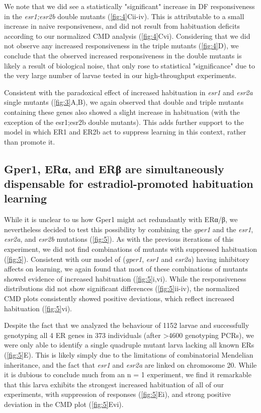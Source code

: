 \documentclass[9.5pt,lineno]{RandlettLab_elife}
\begin{document}
{We note that we did see a statistically "significant" increase in DF responsiveness in the \emph{esr1;esr2b} double mutants (\autoref{fig:4}Cii-iv). 
This is attributable to a small increase in naive responsiveness, and did not result from habituation deficits according to our normalized CMD analysis (\autoref{fig:4}Cvi).
Considering that we did not observe any increased responsiveness in the triple mutants (\autoref{fig:4}D), we conclude that the observed increased responsiveness in the double mutants is likely a result of biological noise, that only rose to statistical "significance" due to the very large number of larvae tested in our high-throughput experiments.

Consistent with the paradoxical effect of increased habituation in \emph{esr1} and \emph{esr2a} single mutants (\autoref{fig:3}A,B), we again observed that double and triple mutants containing these genes also showed a slight increase in habituation (with the exception of the {esr1;esr2b} double mutants).
This adds further support to the model in which ER1 and ER2b act to suppress learning in this context, rather than promote it. 


\subsection{Gper1, ERα, and ERβ are simultaneously dispensable for estradiol-promoted habituation learning}


While it is unclear to us how Gper1 might act redundantly with ERα/β, we nevertheless decided to test this possibility by combining the \emph{gper1} and the \emph{esr1}, \emph{esr2a}, and \emph{esr2b} mutations (\autoref{fig:5}). 
As with the previous iterations of this experiment, we did not find combinations of mutants with suppressed habituation (\autoref{fig:5}). 
Consistent with our model of (\emph{gper1}, \emph{esr1} and \emph{esr2a}) having inhibitory affects on learning, we again found that most of these combinations of mutants showed evidence of increased habituation (\autoref{fig:5}i,vi).
While the  responsiveness distributions did not show significant differences (\autoref{fig:5}ii-iv), the normalized CMD plots consistently showed positive deviations, which reflect increased habituation (\autoref{fig:5}vi).

Despite the fact that we analyzed the behaviour of 1152 larvae and successfully genotyping all 4 ER genes in 373 individuals (after \textgreater 4600 genotyping PCRs), we were only able to identify a single quadruple mutant larva lacking all known ERs (\autoref{fig:5}E). 
This is likely simply due to the limitations of combinatorial Mendelian inheritance, and the fact that \emph{esr1} and \emph{esr2a} are linked on chromosome 20.   
While it is dubious to conclude much from an n = 1 experiment, we find it remarkable that this larva exhibits the strongest increased habituation of all of our experiments, with suppression of responses (\autoref{fig:5}Ei), and strong positive deviation in the CMD plot (\autoref{fig:5}Evi). 

}
\end{document}
